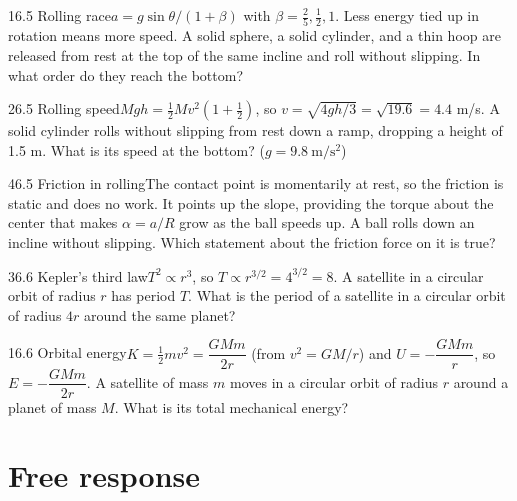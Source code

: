 \documentclass[11pt]{article}
\begin{document}
\begin{q}{1}{6.5 Rolling race}{$a = g\sin\theta/(1 + \beta)$ with $\beta = \tfrac25, \tfrac12, 1$. Less energy tied up in rotation means more speed.}
A solid sphere, a solid cylinder, and a thin hoop are released from rest at the top of the same incline and roll without slipping. In what order do they reach the bottom?
\end{q}
\begin{q}{2}{6.5 Rolling speed}{$Mgh = \tfrac12 Mv^2(1 + \tfrac12)$, so $v = \sqrt{4gh/3} = \sqrt{19.6} = 4.4$ m/s.}
A solid cylinder rolls without slipping from rest down a ramp, dropping a height of 1.5 m. What is its speed at the bottom? ($g = 9.8\ \mathrm{m/s^2}$)
\end{q}
\begin{q}{4}{6.5 Friction in rolling}{The contact point is momentarily at rest, so the friction is static and does no work. It points up the slope, providing the torque about the center that makes $\alpha = a/R$ grow as the ball speeds up.}
A ball rolls down an incline without slipping. Which statement about the friction force on it is true?
\end{q}
\begin{q}{3}{6.6 Kepler's third law}{$T^2 \propto r^3$, so $T \propto r^{3/2} = 4^{3/2} = 8$.}
A satellite in a circular orbit of radius $r$ has period $T$. What is the period of a satellite in a circular orbit of radius $4r$ around the same planet?
\end{q}
\begin{q}{1}{6.6 Orbital energy}{$K = \tfrac12 mv^2 = \dfrac{GMm}{2r}$ (from $v^2 = GM/r$) and $U = -\dfrac{GMm}{r}$, so $E = -\dfrac{GMm}{2r}$.}
A satellite of mass $m$ moves in a circular orbit of radius $r$ around a planet of mass $M$. What is its total mechanical energy?
\end{q}

\section{Free response}
\end{document}
